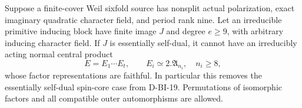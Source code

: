\begin{theorem}
\label{HD-SPIN-01b}
Suppose a finite-cover Weil sixfold source has nonsplit actual
polarization, exact imaginary quadratic character field, and
period rank nine.  Let an irreducible primitive inducing block
have finite image $J$ and degree $e\ge9$, with arbitrary inducing
character field.  If $J$ is essentially self-dual, it cannot have
an irreducibly acting normal central product
\[
                  E=E_1\cdots E_t,\qquad
                  E_i\simeq2.\mathfrak A_{n_i},
                  \quad n_i\ge8,                        \tag{SPIN.4}
\]
whose factor representations are faithful.
In particular this removes the essentially self-dual spin-core
case from D-BI-19.  Permutations of isomorphic factors and all
compatible outer automorphisms are allowed.
\end{theorem}


